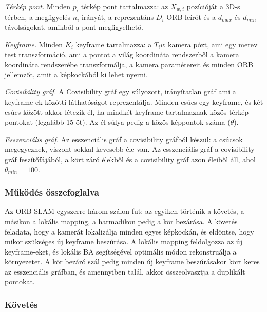 \textit{Térkép pont.} Minden $p_i$ térkép pont tartalmazza: az $X_{w, i}$ pozícióját a 3D-s térben, a megfigyelés $n_i$ irányát, a reprezentáns $D_i$ ORB leírót és a $d_{max}$ és $d_{min}$ távolságokat, amikből a pont megfigyelhető.

\textit{Keyframe.} Minden $K_i$ keyframe tartalmazza: a $T_iw$ kamera pózt, ami egy merev test transzformáció, ami a pontot a világ koordináta rendszerből a kamera koordináta rendszerébe transzformálja, a kamera paramétereit és minden ORB jellemzőt, amit a képkockából ki lehet nyerni. 

\textit{Covisibility gráf.} A Covisibility gráf egy súlyozott, irányítatlan gráf ami a keyframe-ek közötti láthatóságot reprezentálja. 
Minden csúcs egy keyframe, és két csúcs között akkor létezik él, ha mindkét keyframe tartalmaznak közös térkép pontokat (legalább 15-öt). 
Az él súlya pedig a közös képpontok száma ($\theta$).

\textit{Esszenciális gráf.} Az esszenciális gráf a covisibility gráfból készül: a csúcsok megegyeznek, viszont sokkal kevesebb éle van. 
Az esszenciális gráf a covisibility gráf feszítőfájából, a kört záró élekből és a covisibility gráf azon éleiből áll, ahol $\theta_{min} = 100$.

\subsubsection{Működés összefoglalva}
Az ORB-SLAM egyszerre három szálon fut: az egyiken történik a követés, a másikon a lokális mapping, a harmadikon pedig a kör bezárása.
A követés feladata, hogy a kamerát lokalizálja minden egyes képkockán, és eldöntse, hogy mikor szükséges új keyframe beszúrása.
A lokális mapping feldolgozza az új keyframe-eket, és lokális BA segítségével optimális módon rekonstruálja a környezetet.
A kör bezáró szál pedig minden új keyframe beszúrásakor kört keres az esszenciális gráfban, és amennyiben talál, akkor összeolvasztja a duplikált pontokat.

\subsubsection{Követés}

